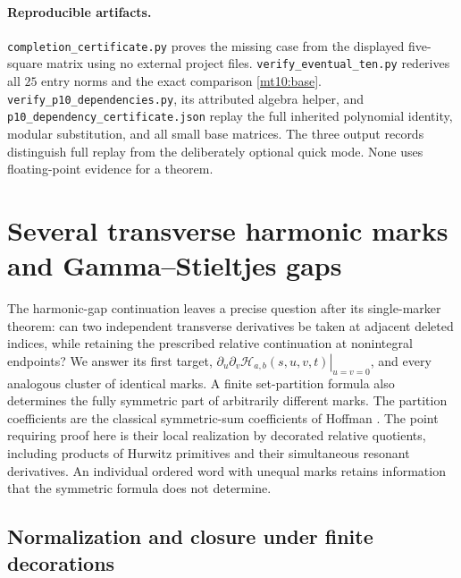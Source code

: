 \documentclass[11pt,a4paper]{article}
\numberwithin{equation}{section}
\theoremstyle{definition}
\theoremstyle{remark}
\begin{document}
\paragraph{Reproducible artifacts.}
\texttt{completion\_certificate.py} proves the missing case from
the displayed five-square matrix using no external project files.
\texttt{verify\_eventual\_ten.py} rederives all $25$ entry norms and
the exact comparison \eqref{mt10:base}.
\texttt{verify\_p10\_dependencies.py}, its attributed algebra helper,
and \texttt{p10\_dependency\_certificate.json} replay the full inherited
polynomial identity, modular substitution, and all small base matrices.
The three output records distinguish full replay from the deliberately
optional quick mode. None uses floating-point evidence for a theorem.




\section{Several transverse harmonic marks and Gamma--Stieltjes gaps}
\label{gm:section}

The harmonic-gap continuation \cite{gm:gaps-source} leaves a precise
question after its single-marker theorem: can two independent transverse
derivatives be taken at adjacent deleted indices, while retaining the
prescribed relative continuation at nonintegral endpoints?  We answer its
first target,
\(\left.\partial_u\partial_v\mathcal H_{a,b}(s,u,v,t)\right|_{u=v=0}\),
and every analogous cluster of identical marks.  A finite set-partition
formula also determines the fully symmetric part of arbitrarily different
marks.  The partition coefficients are the classical symmetric-sum
coefficients of Hoffman \cite{gm:Hoffman1992,gm:Hoffman2018}.  The point
requiring proof here is their local realization by decorated relative
quotients, including products of Hurwitz primitives and their simultaneous
resonant derivatives.  An individual ordered word with unequal marks
retains information that the symmetric formula does not determine.

\subsection{Normalization and closure under finite decorations}
\end{document}

